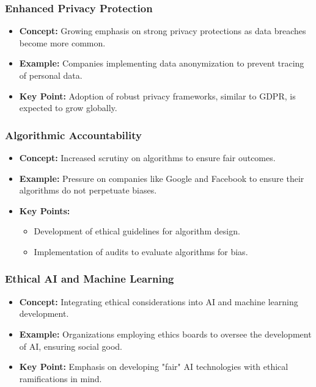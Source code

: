 \documentclass{beamer}
\begin{document}
\begin{frame}[fragile]
    \frametitle{Enhanced Privacy Protection}
    \begin{itemize}
        \item \textbf{Concept:} Growing emphasis on strong privacy protections as data breaches become more common.
        \item \textbf{Example:} Companies implementing data anonymization to prevent tracing of personal data.
        \item \textbf{Key Point:} Adoption of robust privacy frameworks, similar to GDPR, is expected to grow globally.
    \end{itemize}
\end{frame}

\begin{frame}[fragile]
    \frametitle{Algorithmic Accountability}
    \begin{itemize}
        \item \textbf{Concept:} Increased scrutiny on algorithms to ensure fair outcomes.
        \item \textbf{Example:} Pressure on companies like Google and Facebook to ensure their algorithms do not perpetuate biases.
    \end{itemize}
    \begin{itemize}
        \item \textbf{Key Points:}
        \begin{itemize}
            \item Development of ethical guidelines for algorithm design.
            \item Implementation of audits to evaluate algorithms for bias.
        \end{itemize}
    \end{itemize}
\end{frame}

\begin{frame}[fragile]
    \frametitle{Ethical AI and Machine Learning}
    \begin{itemize}
        \item \textbf{Concept:} Integrating ethical considerations into AI and machine learning development.
        \item \textbf{Example:} Organizations employing ethics boards to oversee the development of AI, ensuring social good.
        \item \textbf{Key Point:} Emphasis on developing "fair" AI technologies with ethical ramifications in mind.
    \end{itemize}
\end{frame}
\end{document}
